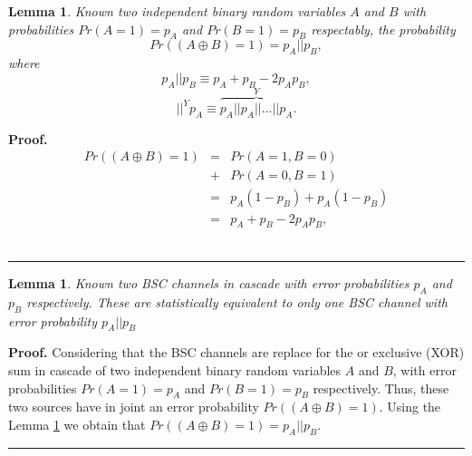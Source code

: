 \documentclass[journal]{IEEEtran}
\newtheorem{lemma}[theorem]{Lemma}
\newenvironment{proof}[1][Proof]{\textbf{#1.} }{\ \rule{0.5em}{0.5em}}
\begin{document}
\begin{lemma}
\label{lemma:xor}
Known two independent binary random variables $A$ and $B$ with probabilities $Pr(A=1)=p_A$ and $Pr(B=1)=p_B$ respectably,
the probability 
\begin{equation} \label{eq:ab}
 Pr( (A \oplus B) = 1)= p_A || p_B,
\end{equation}
where
\begin{equation} \label{eq:ab2}
 p_A || p_B \equiv p_A + p_B -2 p_A p_B, 
\end{equation}
\begin{equation} \label{eq:ab3}
||^Y p_A \equiv \overset{Y}{\overbrace{p_A || p_A || ... || p_A}} .
\end{equation}
\end{lemma}
\begin{proof}
\label{proof:minimo}
\begin{equation}\label{eq:ab4}
\begin{matrix}
Pr( (A \oplus B) = 1) &=& Pr(A=1,B=0) \\
~                     &+& Pr(A=0,B=1)\\ 
~                     &=& p_A (1-p_B) + p_A (1-p_B)\\
~                     &=& p_A + p_B -2 p_A p_B, 
\end{matrix}
\end{equation}
\end{proof}
\begin{lemma}
\label{lemma:twobsc}
Known two BSC channels in cascade with  error probabilities $p_A$ and $p_B$ 
respectively. These are statistically equivalent to only one BSC channel with error 
probability $p_A||p_B$
\end{lemma}
\begin{proof}
\label{proof:twobsc}
Considering that the BSC channels are replace for the or exclusive (XOR) sum in 
cascade of two independent binary random variables $A$ and $B$, with error 
probabilities $Pr(A=1)=p_A$ and $Pr(B=1)=p_B$ respectively. Thus, these two 
sources have in joint an error probability $Pr( (A \oplus B) =1 )$. Using the 
Lemma \ref{lemma:xor} we obtain that $Pr( (A \oplus B) =1 )=p_A||p_B$.
\end{proof}
\end{document}
